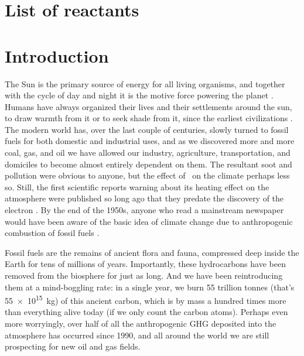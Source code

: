 \documentclass[draft,webedition,openright,titles,swedish,english]{LuaUUThesis}\usepackage[]{graphicx}\usepackage[]{xcolor}
\begin{document}
\printunsrtglossary[%
   type=abbreviations,%
   style=list,%
   title={List of abbreviations},%
   preamble={}%
]



\clearpage
\newcommand{\listofreactantsname}{List of reactants}
\chapter*{\listofreactantsname}
\addcontentsline{toc}{chapter}{\listofreactantsname}
\ifdraft{\printreactants*}{\printreactants}



\mainmatter


\chapter{Introduction}
\label{ch:introduction}

The Sun is the primary source of energy for all living organisms,
and together with the cycle of day and night it is
the motive force powering the planet \cite{Schneider2005}.
Humans have always organized their lives and their settlements around the sun,
to draw warmth from it or to seek shade from it, since the earliest civilizations
\cite{Perlin2013}.
The modern world has, over the last couple of centuries, slowly turned to fossil fuels
for both domestic and industrial uses, and as we discovered more and more coal, gas,
and oil we have allowed our industry, agriculture, transportation, and
domiciles to become almost entirely dependent on them.
The resultant soot and pollution were obvious to anyone, but the effect of
\carbondiox\ on the climate perhaps less so. Still, the first scientific
reports warning about its heating effect on the atmosphere were
published so long ago \cite{Arrhenius1896,Tyndall1861,Jackson2019}
that they predate the discovery of the electron \cite{Thomson1897}.
By the end of the 1950s, anyone who read a mainstream newspaper
would have been aware of the basic idea of climate change due to anthropogenic
combustion of fossil fuels \cite{Hudson2023}.

Fossil fuels are the remains of ancient flora and fauna, compressed deep inside the Earth
for tens of millions of years. Importantly, these hydrocarbons
have been removed from the biosphere for just as long.
And we have been reintroducing them at a mind-boggling rate:
in a single year, we burn \num{55} trillion tonnes (that's \qty{55e15}{\kg}) of
this ancient carbon, which is by mass a hundred times more than everything
alive today (if we only count the carbon atoms).
Perhaps even more worryingly, over half of all the anthropogenic \gls{GHG} deposited
into the atmosphere has occurred since 1990, and all around the world we are still
prospecting for new oil and gas fields.
\end{document}
